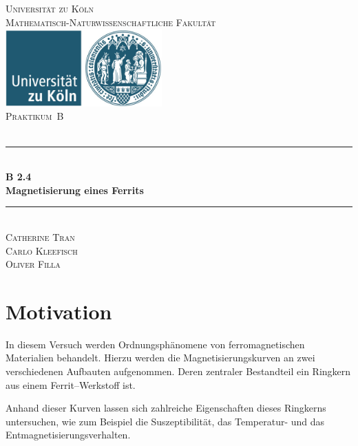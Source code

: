 \documentclass[12pt,a4paper]{scrartcl}
\numberwithin{equation}{section} %
\newcommand{\HRule}{\rule{\linewidth}{0.7mm}}
\begin{document}
\begin{titlepage}
	\pagestyle{empty}

	\begin{center}

	\textsc{\LARGE Universität zu Köln }\\ [0.4cm]
	\textsc{Mathematisch-Naturwissenschaftliche Fakultät} \\[1.5cm]

	\includegraphics[width=0.45\textwidth]{../media/uni}\\[1.5cm]  %

	\textsc{\Large Praktikum~B}\\[2mm]
	\textsc{}\\[10mm]
	\HRule \\[0.4cm]

		{	\Huge \bfseries B 2.4}\\[0.4cm]
			{	\huge \bfseries Magnetisierung eines Ferrits}\\[0.3cm]
	
		\HRule \\[3cm]

		\textsc{\Large Catherine Tran } \\[3pt]
		\textsc{\Large Carlo Kleefisch } \\[3pt]
		\textsc{\Large Oliver Filla } \\[3pt]
		
	\end{center}
\end{titlepage}

\newpage
\tableofcontents

\clearpage
\hypertarget{motivation}{%
\section{Motivation}\label{motivation}}
In diesem Versuch werden Ordnungsphänomene von ferromagnetischen Materialien behandelt. Hierzu werden die Magnetisierungskurven an zwei verschiedenen Aufbauten aufgenommen. Deren zentraler Bestandteil ein Ringkern aus einem Ferrit--Werkstoff ist.

Anhand dieser Kurven lassen sich zahlreiche Eigenschaften dieses Ringkerns untersuchen, wie zum Beispiel die Suszeptibilität, das Temperatur- und das Entmagnetisierungsverhalten.
\end{document}
